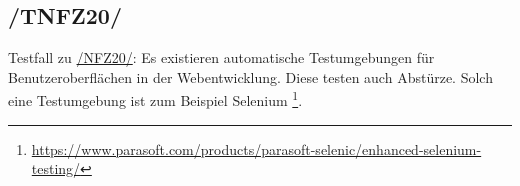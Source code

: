 \subsection*{/TNFZ20/}

\label{/TNFZ20/} Testfall zu \hyperref[/NFZ20/]{/NFZ20/}: Es existieren automatische Testumgebungen für Benutzeroberflächen in der Webentwicklung.
Diese testen auch Abstürze.
Solch eine Testumgebung ist zum Beispiel Selenium \footnote{\href{https://www.parasoft.com/products/parasoft-selenic/enhanced-selenium-testing/}{https://www.parasoft.com/products/parasoft-selenic/enhanced-selenium-testing/}}.